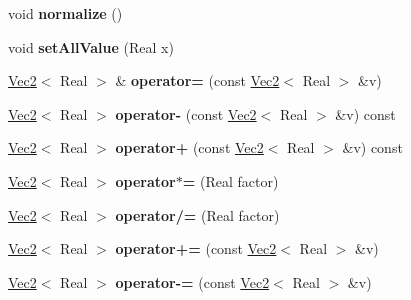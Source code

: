 \begin{DoxyCompactItemize}
\item 
\hypertarget{classhokusai_1_1Vec2_a88f191e807929bd66984885f9fe60023}{void {\bfseries normalize} ()}\label{classhokusai_1_1Vec2_a88f191e807929bd66984885f9fe60023}

\item 
\hypertarget{classhokusai_1_1Vec2_ab58978facf83bb21127e117e0de8232c}{void {\bfseries set\+All\+Value} (Real x)}\label{classhokusai_1_1Vec2_ab58978facf83bb21127e117e0de8232c}

\item 
\hypertarget{classhokusai_1_1Vec2_a1da815130035a7bf05bab1cbc4d805dd}{\hyperlink{classhokusai_1_1Vec2}{Vec2}$<$ Real $>$ \& {\bfseries operator=} (const \hyperlink{classhokusai_1_1Vec2}{Vec2}$<$ Real $>$ \&v)}\label{classhokusai_1_1Vec2_a1da815130035a7bf05bab1cbc4d805dd}

\item 
\hypertarget{classhokusai_1_1Vec2_aa177ee03d348b9debf6e855d62b701c2}{\hyperlink{classhokusai_1_1Vec2}{Vec2}$<$ Real $>$ {\bfseries operator-\/} (const \hyperlink{classhokusai_1_1Vec2}{Vec2}$<$ Real $>$ \&v) const }\label{classhokusai_1_1Vec2_aa177ee03d348b9debf6e855d62b701c2}

\item 
\hypertarget{classhokusai_1_1Vec2_a7e4addaa852a495488330ca2b7fc208a}{\hyperlink{classhokusai_1_1Vec2}{Vec2}$<$ Real $>$ {\bfseries operator+} (const \hyperlink{classhokusai_1_1Vec2}{Vec2}$<$ Real $>$ \&v) const }\label{classhokusai_1_1Vec2_a7e4addaa852a495488330ca2b7fc208a}

\item 
\hypertarget{classhokusai_1_1Vec2_a4d7e9ead757ed9b56efb912e11e577df}{\hyperlink{classhokusai_1_1Vec2}{Vec2}$<$ Real $>$ {\bfseries operator$\ast$=} (Real factor)}\label{classhokusai_1_1Vec2_a4d7e9ead757ed9b56efb912e11e577df}

\item 
\hypertarget{classhokusai_1_1Vec2_aafb096990f77c50a46e5abafd90bcbd7}{\hyperlink{classhokusai_1_1Vec2}{Vec2}$<$ Real $>$ {\bfseries operator/=} (Real factor)}\label{classhokusai_1_1Vec2_aafb096990f77c50a46e5abafd90bcbd7}

\item 
\hypertarget{classhokusai_1_1Vec2_af527d81b7a1ebedd5a7d161fc9658857}{\hyperlink{classhokusai_1_1Vec2}{Vec2}$<$ Real $>$ {\bfseries operator+=} (const \hyperlink{classhokusai_1_1Vec2}{Vec2}$<$ Real $>$ \&v)}\label{classhokusai_1_1Vec2_af527d81b7a1ebedd5a7d161fc9658857}

\item 
\hypertarget{classhokusai_1_1Vec2_a9b7a58771b961da2896bf7864834a447}{\hyperlink{classhokusai_1_1Vec2}{Vec2}$<$ Real $>$ {\bfseries operator-\/=} (const \hyperlink{classhokusai_1_1Vec2}{Vec2}$<$ Real $>$ \&v)}\label{classhokusai_1_1Vec2_a9b7a58771b961da2896bf7864834a447}


\end{DoxyCompactItemize}
